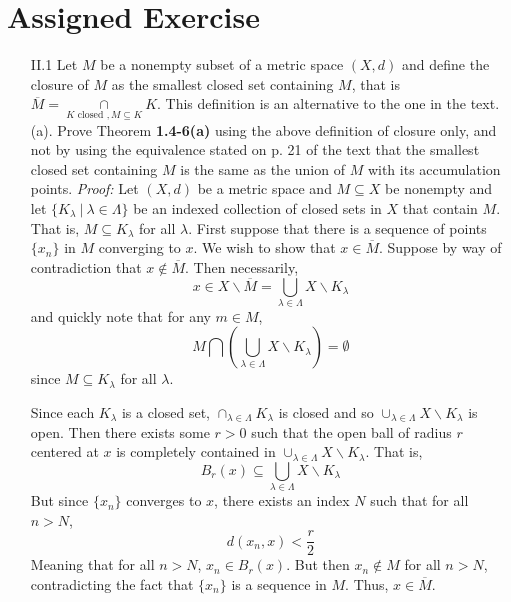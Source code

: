 \documentclass{article}
\begin{document}
\section*{Assigned Exercise}
\begin{itemize}
    \item[II.1] Let $M$ be a nonempty subset of a metric space $(X,d)$ and define the closure of $M$ as the smallest closed set containing $M$, that is $\overline{M} = \underset{K \text{ closed }, M \subseteq K}{\cap}K$. This definition is an alternative to the one in the text. 
    \newline
    (a). Prove Theorem \textbf{1.4-6(a)} using the above definition of closure only, and not by using the equivalence stated on p. 21 of the text that the smallest closed set containing $M$ is the same as the union of $M$ with its accumulation points.
    \newline\newline
    \textit{Proof:} Let $(X,d)$ be a metric space and $M \subseteq X$ be nonempty and let $\{K_{\lambda} \: | \: \lambda \in \Lambda\}$ be an indexed collection of closed sets in $X$ that contain $M$. That is, $M \subseteq K_{\lambda}$ for all $\lambda$. 
    First suppose that there is a sequence of points $\{x_n\}$ in $M$ converging to $x$. We wish to show that $x \in \overline{M}$. Suppose by way of contradiction that $x \notin \overline{M}$. Then necessarily,
    \[x \in X \backslash \overline{M} = \bigcup_{\lambda \in \Lambda} X \backslash K_{\lambda}\]
    and quickly note that for any $m \in M$,
    \[M \bigcap\left( \bigcup_{\lambda \in \Lambda} X \backslash K_{\lambda}\right) = \emptyset\]
    since $M \subseteq K_{\lambda}$ for all $\lambda$.
    
    Since each $K_{\lambda}$ is a closed set, $\cap_{\lambda \in \Lambda} K_{\lambda}$ is closed and so $\cup_{\lambda \in \Lambda} X \backslash K_{\lambda}$ is open. Then there exists some $r > 0$ such that the open ball of radius $r$ centered at $x$ is completely contained in $\cup_{\lambda \in \Lambda} X \backslash K_{\lambda}$. That is,
    \[B_r(x) \subseteq \bigcup_{\lambda \in \Lambda} X \backslash K_{\lambda}\]
    But since $\{x_n\}$ converges to $x$, there exists an index $N$ such that for all $n > N$, 
    \[d(x_n,x) < \frac{r}{2}\]
    Meaning that for all $n > N$, $x_n \in B_r(x)$. But then $x_n \notin M$ for all $n > N$, contradicting the fact that $\{x_n\}$ is a sequence in $M$. Thus, $x \in \overline{M}$.
    \\
    

\end{itemize}
\end{document}
